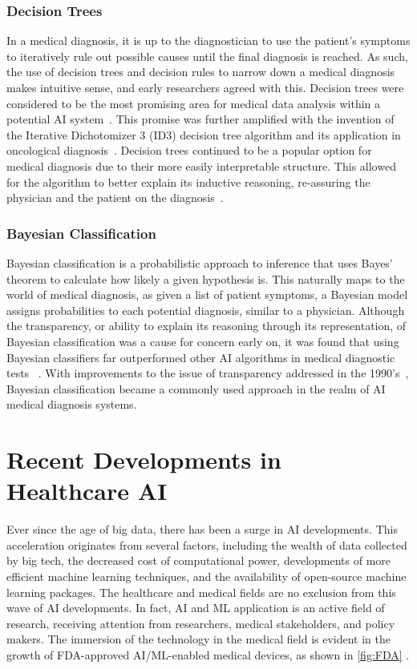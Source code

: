 \documentclass[a4paper]{article}
\begin{document}
\subsubsection{Decision Trees}
In a medical diagnosis, it is up to the diagnostician to use the patient's symptoms to iteratively rule out possible causes until the final diagnosis is reached. As such, the use of decision trees and decision rules to narrow down a medical diagnosis makes intuitive sense, and early researchers agreed with this. Decision trees were considered to be the most promising area for medical data analysis within a potential AI system~\cite{kononenko_machine_2001}. This promise was further amplified with the invention of the Iterative Dichotomizer 3 (ID3) decision tree algorithm and its application in oncological diagnosis~\cite{kononenko_machine_2001}. Decision trees continued to be a popular option for medical diagnosis due to their more easily interpretable structure. This allowed for the algorithm to better explain its inductive reasoning, re-assuring the physician and the patient on the diagnosis~\cite{kononenko_machine_2001}. 

\subsubsection{Bayesian Classification}
Bayesian classification is a probabilistic approach to inference that uses Bayes' theorem to calculate how likely a given hypothesis is. This naturally maps to the world of medical diagnosis, as given a list of patient symptoms, a Bayesian model assigns probabilities to each potential diagnosis, similar to a physician. Although the transparency, or ability to explain its reasoning through its representation, of Bayesian classification was a cause for concern early on, it was found that using Bayesian classifiers far outperformed other AI algorithms in medical diagnostic tests~ \cite{kononenko_machine_2001}. With improvements to the issue of transparency addressed in the 1990's~\cite{kononenko_machine_2001}, Bayesian classification became a commonly used approach in the realm of AI medical diagnosis systems.  

\section{Recent Developments in Healthcare AI}
Ever since the age of big data, there has been a surge in AI developments. 
This acceleration originates from several factors, including the wealth of data collected by big tech, the decreased cost of computational power, developments of more efficient machine learning techniques, and the availability of open-source machine learning packages.
The healthcare and medical fields are no exclusion from this wave of AI developments. 
In fact, AI and ML application is an active field of research, receiving attention from researchers, medical stakeholders, and policy makers.
The immersion of the technology in the medical field is evident in the growth of FDA-approved AI/ML-enabled medical devices, as shown in \autoref{fig:FDA} \cite{FDA_artificial_nodate}.
\end{document}
